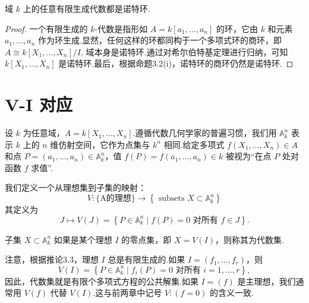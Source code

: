 \begin{corollary}
域 \(k\) 上的任意有限生成代数都是诺特环.
\end{corollary}
\begin{proof}
一个有限生成的 \(k\)-代数是指形如 \(A = k\left\lbrack  {{a}_{1},\ldots ,{a}_{n}}\right\rbrack\) 的环，它由 \(k\) 和元素 \({a}_{1},\ldots ,{a}_{n}\) 作为环生成.显然，任何这样的环都同构于一个多项式环的商环，即 \(A \cong  k\left\lbrack  {{X}_{1},\ldots ,{X}_{n}}\right\rbrack  /I\).
域本身是诺特环.通过对希尔伯特基定理进行归纳，可知 \(k\left\lbrack  {{X}_{1},\ldots ,{X}_{n}}\right\rbrack\) 是诺特环.最后，根据命题3.2(i)，诺特环的商环仍然是诺特环.
\end{proof}

\section{V-I 对应}

设 \(k\) 为任意域，\(A = k\left\lbrack  {{X}_{1},\ldots ,{X}_{n}}\right\rbrack\).遵循代数几何学家的普遍习惯，我们用 \({\mathbb{A}}_{k}^{n}\) 表示 \(k\) 上的 \(n\) 维仿射空间，它作为点集与 \({k}^{n}\) 相同.给定多项式 \(f\left( {{X}_{1},\ldots ,{X}_{n}}\right)  \in A\) 和点 \(P = \left( {{a}_{1},\ldots ,{a}_{n}}\right)  \in  {\mathbb{A}}_{k}^{n}\)，值 \(f\left( P \right) = f\left( {{a}_{1},\ldots ,{a}_{n}}\right)  \in  k\) 被视为“在点 \(P\) 处对函数 \(f\) 求值”.

我们定义一个从理想集到子集的映射：
\[
V: \{ \text{A的理想} \}  \rightarrow  \left\{  {\text{ subsets }X \subset  {\mathbb{A}}_{k}^{n}}\right\}
\]
其定义为
\[
J \mapsto  V\left( J\right)  = \left\{  {P \in  {\mathbb{A}}_{k}^{n} \mid  f\left( P\right)  = 0 \text{ 对所有 } f \in  J}\right\}  .
\]

\begin{definition}[代数集]
子集 \(X \subset  {\mathbb{A}}_{k}^{n}\) 如果是某个理想 \(I\) 的零点集，即 \(X = V\left( I\right)\)，则称其为代数集.
\end{definition}
注意，根据推论3.3，理想 \(I\) 总是有限生成的.如果 \(I = \left( {{f}_{1},\ldots ,{f}_{r}}\right)\)，则
\[
V\left( I\right)  = \left\{  {P \in  {\mathbb{A}}_{k}^{n} \mid  {f}_{i}\left( P\right)  = 0 \text{ 对所有 } i = 1,\ldots ,r}\right\}  ,
\]
因此，代数集就是有限个多项式方程的公共解集.如果 \(I = \left( f\right)\) 是主理想，我们通常用 \(V\left( f\right)\) 代替 \(V\left( I\right)\).这与前两章中记号 \(V : \left( {f = 0}\right)\) 的含义一致.

